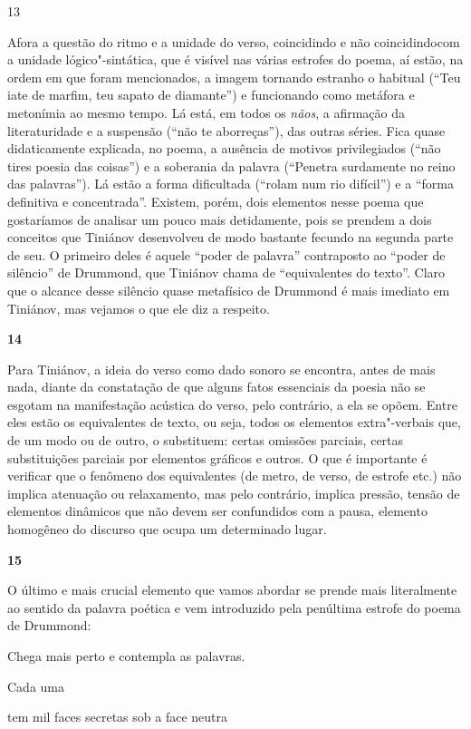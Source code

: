 13

Afora a questão do ritmo e a unidade do verso, coincidindo e não
coincidindocom a unidade lógico"-sintática, que é visível nas várias
estrofes do poema, aí estão, na ordem em que foram mencionados, a imagem
tornando estranho o habitual (``Teu iate de marfim, teu sapato de
diamante'') e funcionando como metáfora e metonímia ao mesmo tempo. Lá
está, em todos os \emph{nãos}, a afirmação da literaturidade e a
suspensão (``não te aborreças''), das outras séries. Fica quase
didaticamente explicada, no poema, a ausência de motivos privilegiados
(``não tires poesia das coisas'') e a soberania da palavra (``Penetra
surdamente no reino das palavras''). Lá estão a forma dificultada
(``rolam num rio difícil'') e a ``forma definitiva e concentrada''.
Existem, porém, dois elementos nesse poema que gostaríamos de analisar
um pouco mais detidamente, pois se prendem a dois conceitos que Tiniánov
desenvolveu de modo bastante fecundo na segunda parte de seu. O primeiro
deles é aquele ``poder de palavra'' contraposto ao ``poder de silêncio''
de Drummond, que Tiniánov chama de ``equivalentes do texto''. Claro que
o alcance desse silêncio quase metafísico de Drummond é mais imediato em
Tiniánov, mas vejamos o que ele diz a respeito.

\textbf{14}

Para Tiniánov, a ideia do verso como dado sonoro se encontra, antes de
mais nada, diante da constatação de que alguns fatos essenciais da
poesia não se esgotam na manifestação acústica do verso, pelo contrário,
a ela se opõem. Entre eles estão os equivalentes de texto, ou seja,
todos os elementos extra"-verbais que, de um modo ou de outro, o
substituem: certas omissões parciais, certas substituições parciais por
elementos gráficos e outros. O que é importante é verificar que o
fenômeno dos equivalentes (de metro, de verso, de estrofe etc.) não
implica atenuação ou relaxamento, mas pelo contrário, implica pressão,
tensão de elementos dinâmicos que não devem ser confundidos com a pausa,
elemento homogêneo do discurso que ocupa um determinado lugar.

\textbf{15}

O último e mais crucial elemento que vamos abordar se prende mais
literalmente ao sentido da palavra poética e vem introduzido pela
penúltima estrofe do poema de Drummond:

Chega mais perto e contempla as palavras.

Cada uma

tem mil faces secretas sob a face neutra

